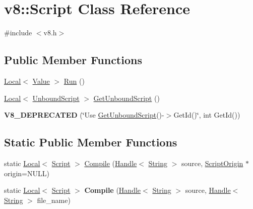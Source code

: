 \hypertarget{classv8_1_1_script}{}\section{v8\+:\+:Script Class Reference}
\label{classv8_1_1_script}


{\ttfamily \#include $<$v8.\+h$>$}

\subsection*{Public Member Functions}
\begin{DoxyCompactItemize}
\item 
\hyperlink{classv8_1_1_local}{Local}$<$ \hyperlink{classv8_1_1_value}{Value} $>$ \hyperlink{classv8_1_1_script_a5f43b29d40bd51ebad2cc275ba3898a1}{Run} ()
\item 
\hyperlink{classv8_1_1_local}{Local}$<$ \hyperlink{classv8_1_1_unbound_script}{Unbound\+Script} $>$ \hyperlink{classv8_1_1_script_afac25cad452a61897c375c2b881e2070}{Get\+Unbound\+Script} ()
\item 
\hypertarget{classv8_1_1_script_a0b781b6966adf4beb558eea17bfd998c}{}{\bfseries V8\+\_\+\+D\+E\+P\+R\+E\+C\+A\+T\+E\+D} (\char`\"{}Use \hyperlink{classv8_1_1_script_afac25cad452a61897c375c2b881e2070}{Get\+Unbound\+Script}()-\/$>$Get\+Id()\char`\"{}, int Get\+Id())\label{classv8_1_1_script_a0b781b6966adf4beb558eea17bfd998c}

\end{DoxyCompactItemize}
\subsection*{Static Public Member Functions}
\begin{DoxyCompactItemize}
\item 
static \hyperlink{classv8_1_1_local}{Local}$<$ \hyperlink{classv8_1_1_script}{Script} $>$ \hyperlink{classv8_1_1_script_a78500f4a95d75ffd0253f72a6db750b0}{Compile} (\hyperlink{classv8_1_1_handle}{Handle}$<$ \hyperlink{classv8_1_1_string}{String} $>$ source, \hyperlink{classv8_1_1_script_origin}{Script\+Origin} $\ast$origin=N\+U\+L\+L)
\item 
\hypertarget{classv8_1_1_script_ae420c65d6315f3ef8e83e79c17231f4e}{}static \hyperlink{classv8_1_1_local}{Local}$<$ \hyperlink{classv8_1_1_script}{Script} $>$ {\bfseries Compile} (\hyperlink{classv8_1_1_handle}{Handle}$<$ \hyperlink{classv8_1_1_string}{String} $>$ source, \hyperlink{classv8_1_1_handle}{Handle}$<$ \hyperlink{classv8_1_1_string}{String} $>$ file\+\_\+name)\label{classv8_1_1_script_ae420c65d6315f3ef8e83e79c17231f4e}

\end{DoxyCompactItemize}


